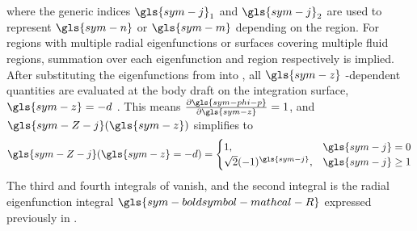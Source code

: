 \documentclass[a4paper,fleqn,colorlinks,unicode,lineno]{cas-dc} %
\providecommand{\DIFaddbegin}{} %
\providecommand{\DIFaddend}{} %
\providecommand{\DIFdelbegin}{} %
\providecommand{\DIFdelend}{} %
\providecommand{\DIFscaledelfig}{0.5}
\newlength{\DIFdelgraphicswidth} %
\newlength{\DIFdelgraphicsheight} %
\providecommand{\DIFaddincludegraphics}[2][]{{\color{blue}\fbox{\DIFOincludegraphics[#1]{#2}}}} %
\providecommand{\DIFdelincludegraphics}[2][]{%
\sbox{\DIFdelgraphicsbox}{\DIFOincludegraphics[#1]{#2}}%
\settoboxwidth{\DIFdelgraphicswidth}{\DIFdelgraphicsbox} %
\settoboxtotalheight{\DIFdelgraphicsheight}{\DIFdelgraphicsbox} %
\scalebox{\DIFscaledelfig}{%
\parbox[b]{\DIFdelgraphicswidth}{\usebox{\DIFdelgraphicsbox}\\[-\baselineskip] \rule{\DIFdelgraphicswidth}{0em}}\llap{\resizebox{\DIFdelgraphicswidth}{\DIFdelgraphicsheight}{%
\setlength{\unitlength}{\DIFdelgraphicswidth}%
\begin{picture}(1,1)%
\thicklines\linethickness{2pt} %
{\color[rgb]{1,0,0}\put(0,0){\framebox(1,1){}}}%
{\color[rgb]{1,0,0}\put(0,0){\line( 1,1){1}}}%
{\color[rgb]{1,0,0}\put(0,1){\line(1,-1){1}}}%
\end{picture}%
}\hspace*{3pt}}} %
} %
\DeclareRobustCommand{\DIFaddbegin}{\DIFOaddbegin \let\includegraphics\DIFaddincludegraphics} %
\DeclareRobustCommand{\DIFaddend}{\DIFOaddend \let\includegraphics\DIFOincludegraphics} %
\DeclareRobustCommand{\DIFdelbegin}{\DIFOdelbegin \let\includegraphics\DIFdelincludegraphics} %
\DeclareRobustCommand{\DIFdelend}{\DIFOaddend \let\includegraphics\DIFOincludegraphics} %
\begin{document}
where the generic indices $\gls{sym-j}_1$ and $\gls{sym-j}_2$  are used to represent $\gls{sym-n}$ or $\gls{sym-m}$  depending on the region.
For regions with multiple radial eigenfunctions or surfaces covering multiple fluid regions, summation over each eigenfunction and region respectively is implied.
After substituting the eigenfunctions from  into , all $\gls{sym-z}$ -dependent quantities are evaluated at the body draft on the integration surface, $\gls{sym-z}=-d$ .
This means $\frac{\partial \gls{sym-phi-p}}{\partial \gls{sym-z}}=1$, and $\gls{sym-Z-j}(\gls{sym-z})$ simplifies to
 \begin{equation}
    \gls{sym-Z-j} (\gls{sym-z} =-d) =
    \DIFdelbegin %
\DIFdelend \DIFaddbegin \begin{cases}
        1,& \gls{sym-j}=0
        \\
        \sqrt2(-1)^{\gls{sym-j}},& \gls{sym-j} \geq 1
    \end{cases}\DIFaddend 
\end{equation}
The third and fourth integrals of  vanish, and the second integral is the radial eigenfunction integral $\gls{sym-boldsymbol-mathcal-R}$  expressed previously in .
\end{document}
